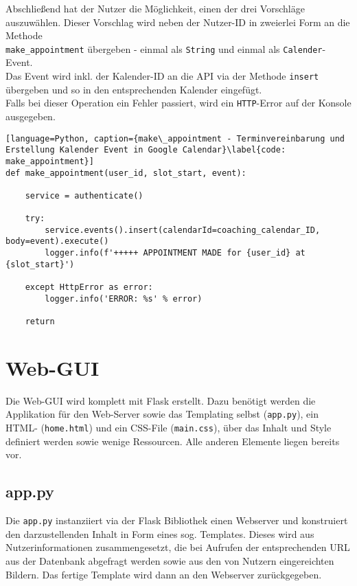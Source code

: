                 Abschließend hat der Nutzer die Möglichkeit, einen der drei Vorschläge auszuwählen. Dieser Vorschlag wird neben der Nutzer-ID in zweierlei Form an die Methode \\\verb|make_appointment| übergeben - einmal als \verb|String| und einmal als \verb|Calender|-Event. \\
                Das Event wird inkl. der Kalender-ID an die API via der Methode \verb|insert| übergeben und so in den entsprechenden Kalender eingefügt. \\
                Falls bei dieser Operation ein Fehler passiert, wird ein \verb|HTTP|-Error auf der Konsole ausgegeben.

                \begin{lstlisting}[language=Python, caption={make\_appointment - Terminvereinbarung und Erstellung Kalender Event in Google Calendar}\label{code: make_appointment}]
def make_appointment(user_id, slot_start, event):

    service = authenticate()

    try:
        service.events().insert(calendarId=coaching_calendar_ID, body=event).execute()
        logger.info(f'+++++ APPOINTMENT MADE for {user_id} at {slot_start}')

    except HttpError as error:
        logger.info('ERROR: %s' % error)

    return
                \end{lstlisting}

    
    \section{Web-GUI}
        Die Web-GUI wird komplett mit Flask erstellt. Dazu benötigt werden die Applikation für den Web-Server sowie das Templating selbst (\verb|app.py|), ein HTML- (\verb|home.html|) und ein CSS-File (\verb|main.css|), über das Inhalt und Style definiert werden sowie wenige Ressourcen. Alle anderen Elemente liegen bereits vor.
        
        \subsection{app.py} \label{Implementierung: app.py}
            Die \verb|app.py| instanziiert via der Flask Bibliothek einen Webserver und konstruiert den darzustellenden Inhalt in Form eines sog. Templates. Dieses wird aus Nutzerinformationen zusammengesetzt, die bei Aufrufen der entsprechenden URL aus der Datenbank abgefragt werden sowie aus den von Nutzern eingereichten Bildern. 
            Das fertige Template wird dann an den Webserver zurückgegeben.

